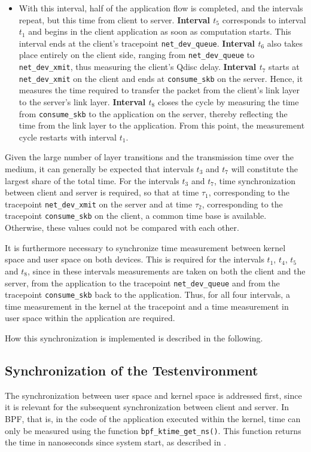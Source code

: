 \begin{itemize}
    \item With this interval, half of the application flow is completed, and the intervals repeat, but this time from client to server.  
          \textbf{Interval $t_5$} corresponds to interval $t_1$ and begins in the client application as soon as computation starts.  
          This interval ends at the client's tracepoint \texttt{net\_dev\_queue}.  
          \textbf{Interval $t_6$} also takes place entirely on the client side, ranging from \texttt{net\_dev\_queue} to \texttt{net\_dev\_xmit}, thus measuring the client's \ac{Qdisc} delay.  
          \textbf{Interval $t_7$} starts at \texttt{net\_dev\_xmit} on the client and ends at \texttt{consume\_skb} on the server.  
          Hence, it measures the time required to transfer the packet from the client's link layer to the server's link layer.  
          \textbf{Interval $t_8$} closes the cycle by measuring the time from \texttt{consume\_skb} to the application on the server, thereby reflecting the time from the link layer to the application.  
          From this point, the measurement cycle restarts with interval $t_1$.  
\end{itemize}

Given the large number of layer transitions and the transmission time over the medium, it can generally be expected that intervals $t_3$ and $t_7$ will constitute the largest share of the total time.  
For the intervals $t_3$ and $t_7$, time synchronization between client and server is required, so that at time $\tau_1$, corresponding to the tracepoint \texttt{net\_dev\_xmit} on the server and at time $\tau_2$, corresponding to the tracepoint \texttt{consume\_skb} on the client, a common time base is available.  
Otherwise, these values could not be compared with each other.  

It is furthermore necessary to synchronize time measurement between kernel space and user space on both devices.  
This is required for the intervals $t_1$, $t_4$, $t_5$ and $t_8$, since in these intervals measurements are taken on both the client and the server, from the application to the tracepoint \texttt{net\_dev\_queue} and from the tracepoint \texttt{consume\_skb} back to the application.  
Thus, for all four intervals, a time measurement in the kernel at the tracepoint and a time measurement in user space within the application are required.  

How this synchronization is implemented is described in the following.

\subsection{Synchronization of the Testenvironment} \label{subsec:impl_uprobe}
The synchronization between user space and kernel space is addressed first, since it is relevant for the subsequent synchronization between client and server.  
In \ac{BPF}, that is, in the code of the application executed within the kernel, time can only be measured using the function \texttt{bpf\_ktime\_get\_ns()}.  
This function returns the time in nanoseconds since system start, as described in \cite{bpf_ktime_get_ns}.  

